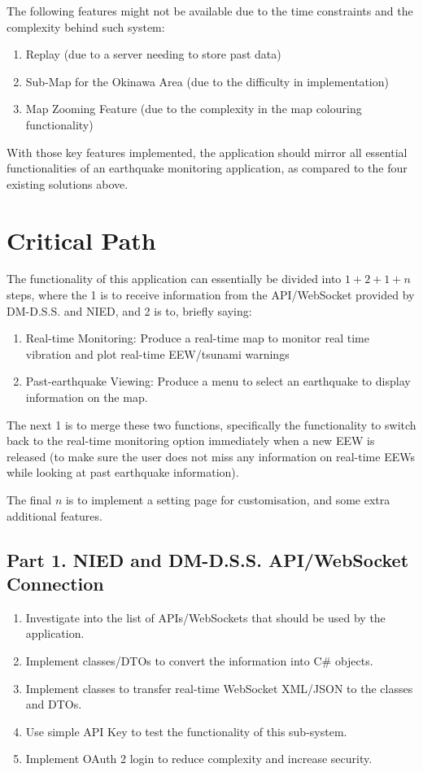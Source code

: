 The following features might not be available due to the time constraints and the complexity behind such system:
\begin{enumerate}
    \item Replay (due to a server needing to store past data)
    \item Sub-Map for the Okinawa Area (due to the difficulty in implementation)
    \item Map Zooming Feature (due to the complexity in the map colouring functionality)
\end{enumerate}

With those key features implemented, the application should mirror all essential functionalities of an earthquake monitoring application, as compared to the four existing solutions above.

\section{Critical Path}

The functionality of this application can essentially be divided into \(1+2+1+n\) steps, where the 1 is to receive information from the API/WebSocket provided by DM-D.S.S. and NIED, and 2 is to, briefly saying:
\begin{enumerate}
    \item Real-time Monitoring: Produce a real-time map to monitor real time vibration and plot real-time EEW/tsunami warnings
    \item Past-earthquake Viewing: Produce a menu to select an earthquake to display information on the map.
\end{enumerate}

The next 1 is to merge these two functions, specifically the functionality to switch back to the real-time monitoring option immediately when a new EEW is released (to make sure the user does not miss any information on real-time EEWs while looking at past earthquake information).

The final \(n\) is to implement a setting page for customisation, and some extra additional features.

\subsection{Part 1. NIED and DM-D.S.S. API/WebSocket Connection}
\begin{enumerate}
    \item Investigate into the list of APIs/WebSockets that should be used by the application.
    \item Implement classes/DTOs to convert the information into C\# objects.
    \item Implement classes to transfer real-time WebSocket XML/JSON to the classes and DTOs.
    \item Use simple API Key to test the functionality of this sub-system.
    \item Implement OAuth 2 login to reduce complexity and increase security.
\end{enumerate}

